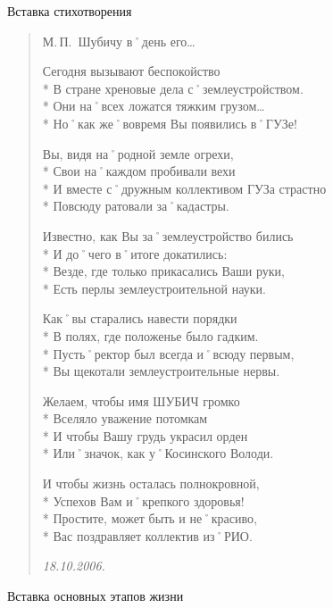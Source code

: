 Вставка стихотворения

\begin{verse}
М.\,П.~Шубичу
в˚день его…

Сегодня вызывают беспокойство\\*
В стране хреновые дела с˚землеустройством.\\*
Они на˚всех ложатся тяжким грузом…\\* 
Но˚как же˚вовремя Вы появились в˚ГУЗе!

Вы, видя на˚родной земле огрехи,\\*
Свои на˚каждом пробивали вехи \\*
И вместе с˚дружным коллективом ГУЗа страстно \\*
Повсюду ратовали за˚кадастры.

Известно, как Вы за˚землеустройство бились \\*
И до˚чего в˚итоге докатились:\\*
Везде, где только прикасались Ваши руки,\\*
Есть перлы землеустроительной науки.

Как˚вы старались навести порядки \\*
В полях, где положенье было гадким.\\*
Пусть˚ректор был всегда и˚всюду первым,\\*
Вы щекотали землеустроительные нервы.

Желаем, чтобы имя ШУБИЧ громко \\*
Вселяло уважение потомкам \\*
И чтобы Вашу грудь украсил орден \\*
Или˚значок, как у˚Косинского Володи.

И чтобы жизнь осталась полнокровной,\\*
Успехов Вам и˚крепкого здоровья!\\*
Простите, может быть и не˚красиво,\\*
Вас поздравляет коллектив из˚РИО. 

\textit{18.10.2006.}
\end{verse}


Вставка основных этапов жизни



